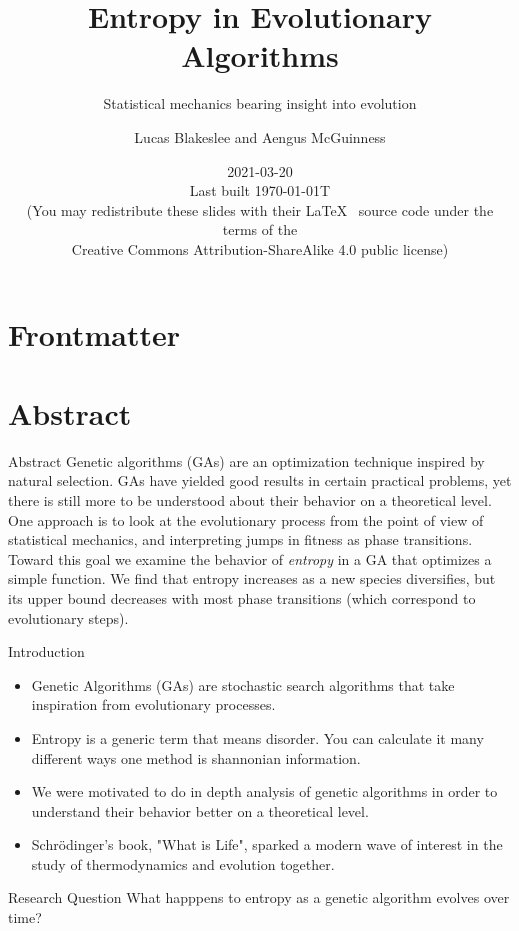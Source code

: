 \documentclass[10pt,aspectratio=169]{beamer}
\title{Entropy in Evolutionary Algorithms}
\subtitle{Statistical mechanics bearing insight into evolution}
\author{Lucas Blakeslee and Aengus McGuinness}
\institute[SF High]{
  Santa Fe High School \\
  Institute for Computing in Research}
\date{2021-03-20 \\
  {\smaller[2] Last built \today{}T\currenttime } \\
  \smallskip
      {\smaller[4] (You may redistribute these slides with their \LaTeX\
        \vspace{-0.1cm}
        source code under the terms of the \\
        Creative Commons Attribution-ShareAlike 4.0 public license)}
}
\begin{document}
\section*{Frontmatter}

\begin{frame}
  \maketitle
\end{frame}

\section{Abstract}

\begin{frame}{Abstract}
	Genetic algorithms (GAs) are an optimization technique inspired by
	natural selection. GAs have yielded good results in certain practical
	problems, yet there is still more to be understood about their
	behavior on a theoretical level. One approach is to look at the
	evolutionary process from the point of view of statistical mechanics,
	and interpreting jumps in fitness as phase transitions. Toward this
	goal we examine the behavior of \emph{entropy} in a GA that optimizes
	a simple function.  We find that entropy increases as a new species
	diversifies, but its upper bound decreases with most phase
	transitions (which correspond to evolutionary steps).
\end{frame}

\begin{frame}{Introduction}
	\begin{itemize}
		\item Genetic Algorithms (GAs) are stochastic search algorithms that take inspiration from evolutionary processes. 
		\item Entropy is a generic term that means disorder. You can calculate it many different ways one method is shannonian information.
		\item We were motivated to do in depth analysis of genetic algorithms in order to understand their behavior better on a theoretical level.
		\item Schrödinger's book, "What is Life", sparked a modern wave of interest in the study of thermodynamics and evolution together.
	\end{itemize}
\end{frame}

\begin{frame}{Research Question}
		What happpens to entropy as a genetic algorithm
                evolves over time?
\end{frame}
\end{document}

